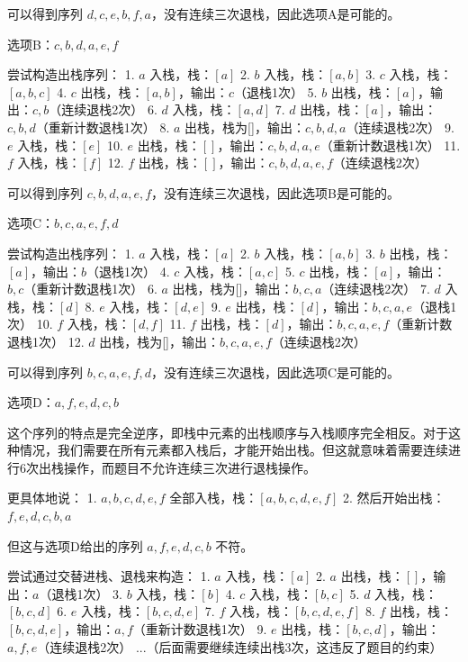 \documentclass[lang=cn,newtx,10pt,scheme=chinese]{../../../elegantbook}
\begin{document}
\begin{enumerate}
    可以得到序列 $d, c, e, b, f, a$，没有连续三次退栈，因此选项A是可能的。

    选项B：$c, b, d, a, e, f$
    
    尝试构造出栈序列：
    1. $a$ 入栈，栈：$[a]$
    2. $b$ 入栈，栈：$[a, b]$
    3. $c$ 入栈，栈：$[a, b, c]$
    4. $c$ 出栈，栈：$[a, b]$，输出：$c$（退栈1次）
    5. $b$ 出栈，栈：$[a]$，输出：$c, b$（连续退栈2次）
    6. $d$ 入栈，栈：$[a, d]$
    7. $d$ 出栈，栈：$[a]$，输出：$c, b, d$（重新计数退栈1次）
    8. $a$ 出栈，栈为[]，输出：$c, b, d, a$（连续退栈2次）
    9. $e$ 入栈，栈：$[e]$
    10. $e$ 出栈，栈：$[]$，输出：$c, b, d, a, e$（重新计数退栈1次）
    11. $f$ 入栈，栈：$[f]$
    12. $f$ 出栈，栈：$[]$，输出：$c, b, d, a, e, f$（连续退栈2次）
    
    可以得到序列 $c, b, d, a, e, f$，没有连续三次退栈，因此选项B是可能的。

    选项C：$b, c, a, e, f, d$
    
    尝试构造出栈序列：
    1. $a$ 入栈，栈：$[a]$
    2. $b$ 入栈，栈：$[a, b]$
    3. $b$ 出栈，栈：$[a]$，输出：$b$（退栈1次）
    4. $c$ 入栈，栈：$[a, c]$
    5. $c$ 出栈，栈：$[a]$，输出：$b, c$（重新计数退栈1次）
    6. $a$ 出栈，栈为[]，输出：$b, c, a$（连续退栈2次）
    7. $d$ 入栈，栈：$[d]$
    8. $e$ 入栈，栈：$[d, e]$
    9. $e$ 出栈，栈：$[d]$，输出：$b, c, a, e$（退栈1次）
    10. $f$ 入栈，栈：$[d, f]$
    11. $f$ 出栈，栈：$[d]$，输出：$b, c, a, e, f$（重新计数退栈1次）
    12. $d$ 出栈，栈为[]，输出：$b, c, a, e, f$（连续退栈2次）
    
    可以得到序列 $b, c, a, e, f, d$，没有连续三次退栈，因此选项C是可能的。

    选项D：$a, f, e, d, c, b$
    
    这个序列的特点是完全逆序，即栈中元素的出栈顺序与入栈顺序完全相反。对于这种情况，我们需要在所有元素都入栈后，才能开始出栈。但这就意味着需要连续进行6次出栈操作，而题目不允许连续三次进行退栈操作。

    更具体地说：
    1. $a, b, c, d, e, f$ 全部入栈，栈：$[a, b, c, d, e, f]$
    2. 然后开始出栈：$f, e, d, c, b, a$
    
    但这与选项D给出的序列 $a, f, e, d, c, b$ 不符。

    尝试通过交替进栈、退栈来构造：
    1. $a$ 入栈，栈：$[a]$
    2. $a$ 出栈，栈：$[]$，输出：$a$（退栈1次）
    3. $b$ 入栈，栈：$[b]$
    4. $c$ 入栈，栈：$[b, c]$
    5. $d$ 入栈，栈：$[b, c, d]$
    6. $e$ 入栈，栈：$[b, c, d, e]$
    7. $f$ 入栈，栈：$[b, c, d, e, f]$
    8. $f$ 出栈，栈：$[b, c, d, e]$，输出：$a, f$（重新计数退栈1次）
    9. $e$ 出栈，栈：$[b, c, d]$，输出：$a, f, e$（连续退栈2次）
    ...（后面需要继续连续出栈3次，这违反了题目的约束）
    

\end{enumerate}
\end{document}
